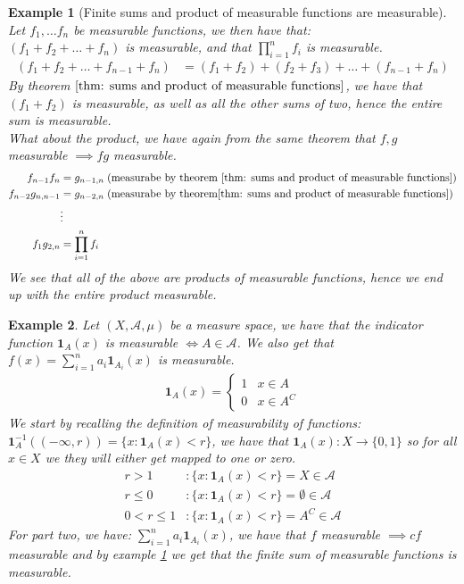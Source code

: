 \documentclass{article}
\newcommand{\A}{\mathcal{A}}
\newtheorem{ex}{Example}
\begin{document}
\begin{ex}[Finite sums and product of measurable functions are measurable]
\label{ex: finite sums and prod are meas}
Let $f_{1}, \dots f_{n}$ be measurable functions, we then have that: \\ 
$(f_{1} + f_{2} +\dots + f_{n})$ is measurable, and that $\prod_{i=1}^{n}f_{i}$ is measurable. 
\begin{align*}
(f_{1}+ f_{2} + \dots +f_{n-1} + f_{n}) &= (f_{1} + f_{2}) + (f_{2} + f_{3}) + \dots + (f_{n-1} + f_{n})    
\end{align*}
By theorem $\ref{thm: sums and product of measurable functions}$, we have that $(f_{1} +f_{2})$ is measurable, as well as all the other sums of two, hence the entire sum is measurable.\\ 
What about the product, we have again from the same theorem that $f,g$ measurable $\implies fg$ measurable. 
\begin{align*}
f_{n-1}f_{n} &= g_{n-1, n}\;(\text{measurabe by theorem \ref{thm: sums and product of measurable functions})}\\ 
f_{n-2}g_{n,n-1} &= g_{n-2,n}\;(\text{measurabe by theorem\ref{thm: sums and product of measurable functions})}\\ 
&\vdots \\
f_{1}g_{2,n} &= \prod_{i=1}^{n}f_{i}
\end{align*}
We see that all of the above are products of measurable functions, hence we end up with the entire product measurable. 
\end{ex}


\begin{ex}
Let $(X,\A, \mu)$ be a measure space, we have that the indicator function $\bm{1}_{A}(x)$ is measurable $\iff A\in \A$. We also get that $f(x) = \sum_{i=1}^{n}a_{i}\bm{1}_{A_{i}}(x)$ is measurable.
\begin{align*}
    \bm{1}_{A}(x) =
    \begin{cases}
      1 & x\in A \\ 
      0 & x\in A^{C}
    \end{cases}
\end{align*}
We start by recalling the definition of measurability of functions: \\
$\bm{1}_{A}^{-1}((-\infty, r)) = \{x: \bm{1}_{A}(x) < r\}$, we have that $\bm{1}_{A}(x):X\to \{0,1\}$ so for all $x\in X$ we they will either get mapped to one or zero. 
\begin{align*}
r > 1&: \{x:\bm{1}_{A}(x) < r\} = X \in \A \\ 
r \leq 0&: \{x: \bm{1}_{A}(x) < r\} = \emptyset \in \A \\ 
0 < r \leq 1&: \{x: \bm{1}_{A}(x) < r\} = A^{C} \in \A
\end{align*} 
For part two, we have: $\sum_{i=1}^{n}a_{i}\bm{1}_{A_{i}}(x)$, we have that $f$ measurable $\implies cf$ measurable and by example \ref{ex: finite sums and prod are meas} we get that the finite sum of measurable functions is measurable.
\end{ex}
\end{document}
